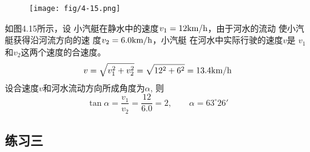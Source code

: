 \begin{enumerate}
\begin{figure}[htp]
    \centering
\texttt{[image: fig/4-15.png]}
    \caption{}
\end{figure}
\begin{solution}
    如图4.15所示，设
    小汽艇在静水中的速度$v_1=12\text{km}/\text{h}$，由于河水的流动
    使小汽艇获得沿河流方向的速
    度$v_2=6.0\text{km}/\text{h}$，小汽艇
    在河水中实际行驶的速度$v$是
    $v_1$和$v_2$这两个速度的合速度。
\[v=\sqrt{v_1^2+v_2^2}=\sqrt{12^2+6^2}=13.4\text{km}/\text{h}\]
设合速度$v$和河水流动方向所成角度为$\alpha$, 则
\[\tan\alpha=\frac{v_1}{v_2}=\frac{12}{6.0}=2,\qquad \alpha=63^{\circ}26'\]
\end{solution}
\end{enumerate}

\subsection{练习三}



